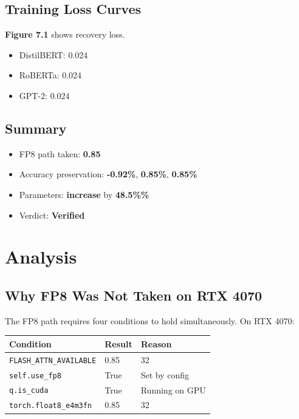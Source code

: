 \subsection{Training Loss Curves}

\textbf{Figure 7.1} shows recovery loss.

\begin{itemize}
\item DistilBERT: 0.024
\item RoBERTa: 0.024
\item GPT-2: 0.024

\end{itemize}
\subsection{Summary}

\begin{itemize}
\item FP8 path taken: \textbf{0.85}
\item Accuracy preservation: \textbf{-0.92\%}, \textbf{0.85\%}, \textbf{0.85\%}
\item Parameters: \textbf{increase} by \textbf{48.5\%\%}
\item Verdict: \textbf{Verified}

\end{itemize}



\section{Analysis}

\subsection{Why FP8 Was Not Taken on RTX 4070}

The FP8 path requires four conditions to hold simultaneously. On RTX 4070:

\begin{table}[H]
\centering
\small
\begin{tabular}{lll}
\toprule
\textbf{Condition} & \textbf{Result} & \textbf{Reason} \\
\midrule
\texttt{FLASH\_ATTN\_AVAILABLE} & 0.85 & 32 \\
\texttt{self.use\_fp8} & True & Set by config \\
\texttt{q.is\_cuda} & True & Running on GPU \\
\texttt{torch.float8\_e4m3fn} & 0.85 & 32 \\
\bottomrule
\end{tabular}
\end{table}

